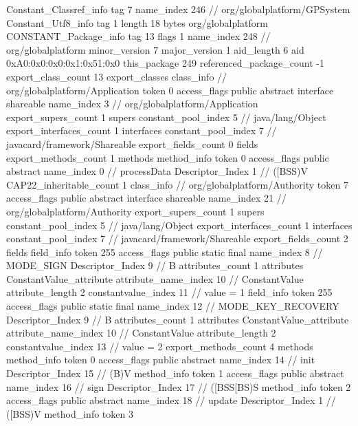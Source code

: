 {{{		}
		Constant_Classref_info {
			tag	7
			name_index	246		// org/globalplatform/GPSystem
		}
		Constant_Utf8_info {
			tag	1
			length	18
			bytes	org/globalplatform
		}
		CONSTANT_Package_info {
			tag	13
			flags	1
			name_index	248		// org/globalplatform
			minor_version	7
			major_version	1
			aid_length	6
			aid	0xA0:0x0:0x0:0x1:0x51:0x0
		}
	}
	this_package	249
	referenced_package_count	-1
	export_class_count	13
	export_classes {
		class_info {		// org/globalplatform/Application
			token	0
			access_flags	public abstract interface shareable
			name_index	3		// org/globalplatform/Application
			export_supers_count	1
			supers {
				constant_pool_index	5		// java/lang/Object
			}
			export_interfaces_count	1
			interfaces {
				constant_pool_index	7		// javacard/framework/Shareable
			}
			export_fields_count	0
			fields {
			}
			export_methods_count	1
			methods {
				method_info {
					token	0
					access_flags	public abstract
					name_index	0		// processData
					Descriptor_Index	1		// ([BSS)V
				}
			}
			CAP22_inheritable_count	1
		}
		class_info {		// org/globalplatform/Authority
			token	7
			access_flags	public abstract interface shareable
			name_index	21		// org/globalplatform/Authority
			export_supers_count	1
			supers {
				constant_pool_index	5		// java/lang/Object
			}
			export_interfaces_count	1
			interfaces {
				constant_pool_index	7		// javacard/framework/Shareable
			}
			export_fields_count	2
			fields {
			field_info {
				token	255
				access_flags	public static final
				name_index	8		// MODE_SIGN
				Descriptor_Index	9		// B
				attributes_count	1
				attributes {
				ConstantValue_attribute {
					attribute_name_index	10		// ConstantValue
					attribute_length	2
					constantvalue_index	11		// value = 1
				}
				}
			}
			field_info {
				token	255
				access_flags	public static final
				name_index	12		// MODE_KEY_RECOVERY
				Descriptor_Index	9		// B
				attributes_count	1
				attributes {
				ConstantValue_attribute {
					attribute_name_index	10		// ConstantValue
					attribute_length	2
					constantvalue_index	13		// value = 2
				}
				}
			}
			}
			export_methods_count	4
			methods {
				method_info {
					token	0
					access_flags	public abstract
					name_index	14		// init
					Descriptor_Index	15		// (B)V
				}
				method_info {
					token	1
					access_flags	public abstract
					name_index	16		// sign
					Descriptor_Index	17		// ([BSS[BS)S
				}
				method_info {
					token	2
					access_flags	public abstract
					name_index	18		// update
					Descriptor_Index	1		// ([BSS)V
				}
				method_info {
					token	3
}}}}}
